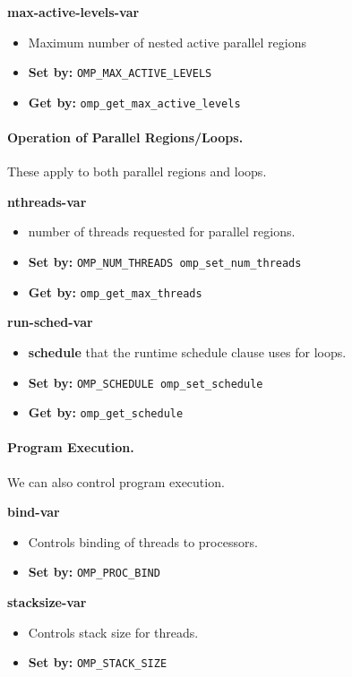   {\bf max-active-levels-var}
  \begin{itemize}
    \item Maximum number of nested active parallel regions
    \item {\bf Set by:} {\tt OMP\_MAX\_ACTIVE\_LEVELS}\\
      \hspace{3.8em}{\tt omp\_set\_max\_active\_levels}
    \item {\bf Get by:} {\tt omp\_get\_max\_active\_levels}
  \end{itemize}

\paragraph{Operation of Parallel Regions/Loops.} These apply to both
parallel regions and loops.

  {\bf nthreads-var}
  \begin{itemize}
    \item number of threads requested for parallel regions.
    \item {\bf Set by:} {\tt OMP\_NUM\_THREADS omp\_set\_num\_threads}
    \item {\bf Get by:} {\tt omp\_get\_max\_threads}
  \end{itemize}

  {\bf run-sched-var}
  \begin{itemize}
    \item {\bf schedule} that the runtime schedule clause uses for loops.
    \item {\bf Set by:} {\tt OMP\_SCHEDULE omp\_set\_schedule}
    \item {\bf Get by:} {\tt omp\_get\_schedule}
  \end{itemize}

\paragraph{Program Execution.} We can also control program execution.

  {\bf bind-var}
  \begin{itemize}
    \item Controls binding of threads to processors.
    \item {\bf Set by:} {\tt OMP\_PROC\_BIND}
  \end{itemize}

  {\bf stacksize-var}
  \begin{itemize}
    \item Controls stack size for threads.
    \item {\bf Set by:} {\tt OMP\_STACK\_SIZE}
  \end{itemize}


